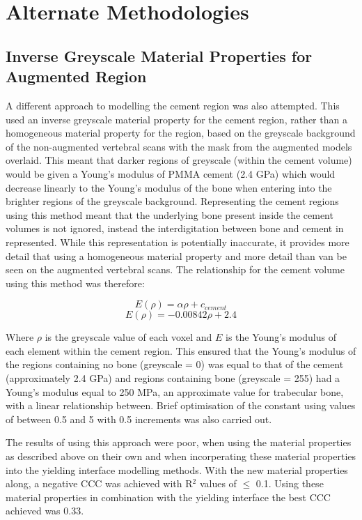 \chapter{Alternate Methodologies} 

\section{Inverse Greyscale Material Properties for Augmented Region} \label{sec:invGS}

A different approach to modelling the cement region was also attempted.  This
used an inverse greyscale material property for the cement region, rather than
a homogeneous material property for the region, based on the greyscale
background of the non-augmented vertebral scans with the mask from the
augmented models overlaid.  This meant that darker regions of greyscale (within
the cement volume) would be given a Young's modulus of PMMA cement (2.4 GPa)
which would decrease linearly to the Young's modulus of the bone when entering
into the brighter regions of the greyscale background.  Representing the cement
regions using this method meant that the underlying bone present inside the
cement volumes is not ignored, instead the interdigitation between bone and
cement in represented.  While this representation is potentially inaccurate, it
provides more detail that using a homogeneous material property and more detail
than van be seen on the augmented vertebral scans.  The relationship for the
cement volume using this method was therefore:

\begin{equation}
	E(\rho) = \alpha \rho + c_{cement}
\end{equation}
\begin{equation}
	E(\rho) = -0.00842 \rho + 2.4
\end{equation}

Where $\rho$ is the greyscale value of each voxel and $E$ is the Young's
modulus of each element within the cement region.  This ensured that the
Young's modulus of the regions containing no bone (greyscale = 0)  was equal to
that of the cement (approximately 2.4 GPa) and regions containing bone (greyscale = 255) had a Young's
modulus equal to 250 MPa, an approximate value for trabecular bone, with a
linear relationship between. Brief optimisation of the constant using values of
between 0.5 and 5 with 0.5 increments was also carried out.

The results of using this approach were poor, when using the material
properties as described above on their own and when incorperating these
material properties into the yielding interface modelling methods. With the
new material properties along, a negative CCC was achieved with R$^2$ values of
$\leq$ 0.1. Using these material properties in combination with the yielding
interface the best CCC achieved was 0.33.

